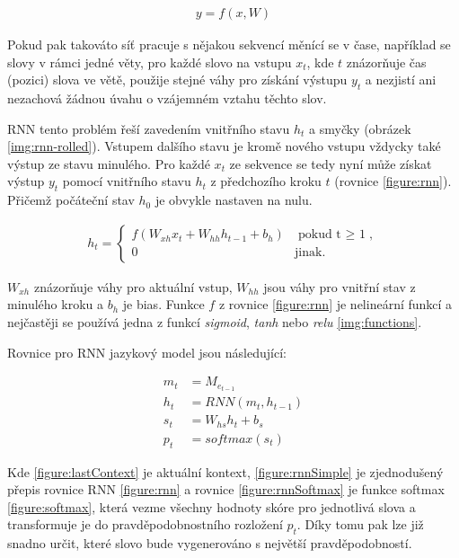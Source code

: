 \begin{align}\label{figure:basic-nn}
  y = f (x, W)
\end{align}

Pokud pak takováto síť pracuje s nějakou sekvencí měnící se v čase, například se slovy v rámci jedné věty, pro každé slovo na vstupu $x_t$, kde $t$ znázorňuje čas (pozici) slova ve větě, použije stejné váhy pro získání výstupu $y_t$ a nezjistí ani nezachová žádnou úvahu o vzájemném vztahu těchto slov.

RNN tento problém řeší zavedením vnitřního stavu $h_t$ a smyčky (obrázek \ref{img:rnn-rolled}). Vstupem dalšího stavu je kromě nového vstupu vždycky také výstup ze stavu minulého. Pro každé $x_t$ ze sekvence se tedy nyní může získat výstup $y_t$ pomocí vnitřního stavu $h_t$ z předchozího kroku $t$ (rovnice \ref{figure:rnn}). Přičemž počáteční stav  $h_0$ je obvykle nastaven na nulu.

\begin{align}\label{figure:rnn}
  h_t = \begin{cases}
          f(W_{xh}x_t + W_{hh}h_{t-1} + b_h) & \mbox{pokud t $\geq$ 1}, \\
          0 & \mbox{jinak}.
        \end{cases}
\end{align}


$W_{xh}$ znázorňuje váhy pro aktuální vstup, $W_{hh}$ jsou váhy pro vnitřní stav z minulého kroku a $b_h$ je bias. Funkce $f$ z rovnice \ref{figure:rnn} je nelineární funkcí a nejčastěji se používá jedna z funkcí \emph{sigmoid}, \emph{tanh} nebo \emph{relu} \ref{img:functions}. 

Rovnice pro RNN jazykový model jsou následující:

\begin{align}
  m_{t}&=M_{e_{t-1}}\label{figure:lastContext} \\
  h_{t}&=RNN(m_t, h_{t-1}) \label{figure:rnnSimple} \\
  s_{t}&=W_{hs}h_t + b_s \label{figure:rnnSt} \\
  p_{t}&=softmax(s_t) \label{figure:rnnSoftmax}
\end{align}


Kde \ref{figure:lastContext} je aktuální kontext, \ref{figure:rnnSimple} je zjednodušený přepis rovnice RNN \ref{figure:rnn} a rovnice \ref{figure:rnnSoftmax} je funkce softmax \ref{figure:softmax}, která vezme všechny hodnoty skóre pro jednotlivá slova a transformuje je do pravděpodobnostního rozložení $p_t$. Díky tomu pak lze již snadno určit, které slovo bude vygenerováno s největší pravděpodobností.

